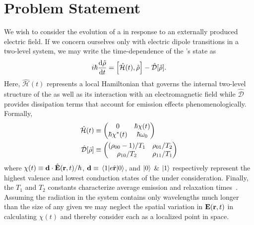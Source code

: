 \section{\label{section:problem statement}Problem Statement}
We wish to consider the evolution of a \qd{} in response to an externally produced electric field.
If we concern ourselves only with electric dipole transitions in a two-level system, we may write the time-dependence of the \qd's state as
\begin{equation}
  i \hbar \dv{\hat{\rho}}{t} = \commutator{\hat{\mathcal{H}}(t)}{\hat{\rho}} - \hat{\mathcal{D}}\qty[\hat{\rho}].
  \label{eq:liouville}
\end{equation}
Here, $\hat{\mathcal{H}}(t)$ represents a local Hamiltonian that governs the internal two-level structure of the \qd{} as well as its interaction with an electromagnetic field while $\hat{\mathcal{D}}$ provides dissipation terms that account for emission effects phenomenologically.
Formally,
\begin{subequations}
  \begin{align}
    \hat{\mathcal{H}}(t) &\equiv \mqty(0 & \hbar \chi(t) \\ \hbar \chi^*(t) & \hbar \omega_0) \label{eq:hamiltonian}\\
    \hat{\mathcal{D}}\qty[\hat{\rho}] &\equiv \mqty( \qty(\rho_{00} - 1)/{T_1} & \rho_{01}/{T_2} \\ \rho_{10}/{T_2} & \rho_{11}/T_1 ) \label{eq:dissipator}
  \end{align}
\end{subequations}
where $\chi(t) \equiv \vb{d} \cdot \hat{\vb{E}}(\vb{r}, t)/\hbar$, $\vb{d} \equiv \matrixel{1}{e \hat{\vb{r}}}{0}$, and $\ket{0}$ \& $\ket{1}$ respectively represent the highest valence and lowest conduction states of the \qd{} under consideration.
Finally, the $T_1$ and $T_2$ constants characterize average emission and relaxation times~\cite{}.
Assuming the radiation in the system contains only wavelengths much longer than the size of any given \qd{} we may neglect the spatial variation in $\vb{E}(\vb{r}, t)$ in calculating $\chi(t)$ and thereby consider each \qd{} as a localized point in space.

